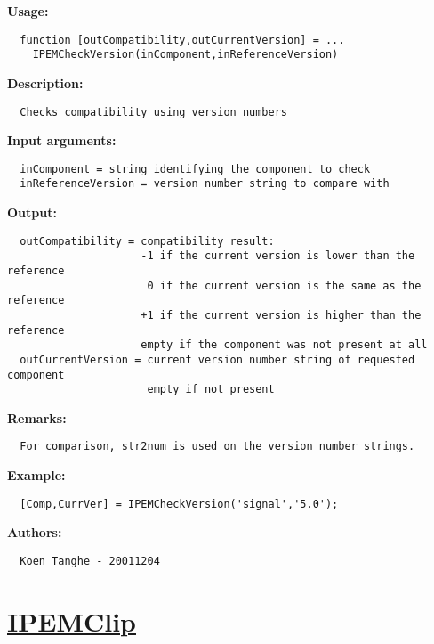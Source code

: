 \textbf{Usage:}
\begin{verbatim}  function [outCompatibility,outCurrentVersion] = ...
    IPEMCheckVersion(inComponent,inReferenceVersion)

\end{verbatim}
\textbf{Description:}
\begin{verbatim}  Checks compatibility using version numbers

\end{verbatim}
\textbf{Input arguments:}
\begin{verbatim}  inComponent = string identifying the component to check
  inReferenceVersion = version number string to compare with

\end{verbatim}
\textbf{Output:}
\begin{verbatim}  outCompatibility = compatibility result:
                     -1 if the current version is lower than the reference
                      0 if the current version is the same as the reference
                     +1 if the current version is higher than the reference
                     empty if the component was not present at all
  outCurrentVersion = current version number string of requested component
                      empty if not present

\end{verbatim}
\textbf{Remarks:}
\begin{verbatim}  For comparison, str2num is used on the version number strings.

\end{verbatim}
\textbf{Example:}
\begin{verbatim}  [Comp,CurrVer] = IPEMCheckVersion('signal','5.0');

\end{verbatim}
\textbf{Authors:}
\begin{verbatim}  Koen Tanghe - 20011204
\end{verbatim}


\newpage
\section*{\hyperlink{Concepts:IPEMClip}{IPEMClip}}
\hypertarget{FuncRef:IPEMClip}{}

